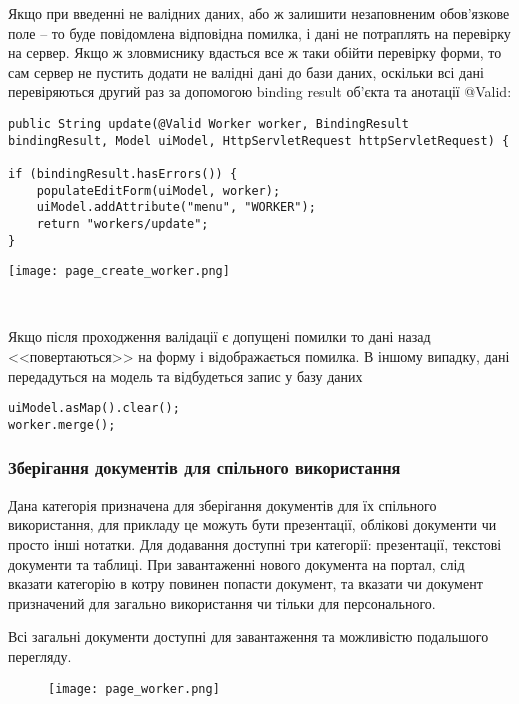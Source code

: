\par Якщо при введенні не валідних даних, або ж залишити незаповненим обов'язкове поле -- то буде повідомлена відповідна помилка, і дані не потраплять на перевірку на сервер. Якщо ж зловмиснику вдасться все ж таки обійти перевірку форми, то сам сервер не пустить додати не валідні дані до бази даних, оскільки всі дані перевіряються другий раз за допомогою binding result об'єкта та анотації @Valid:
\begin{lstlisting}
public String update(@Valid Worker worker, BindingResult bindingResult, Model uiModel, HttpServletRequest httpServletRequest) {

if (bindingResult.hasErrors()) {
    populateEditForm(uiModel, worker);
    uiModel.addAttribute("menu", "WORKER");
    return "workers/update";
}
\end{lstlisting}

\begin{center}
      \texttt{[image: page\_create\_worker.png]}
      \par \
      \label{pic:page_create_worker}
  \end{center}

\par Якщо після проходження валідації є допущені помилки то дані назад <<повертаються>> на форму і відображається помилка. В іншому випадку, дані передадуться на модель та відбудеться запис у базу даних
\begin{lstlisting}
uiModel.asMap().clear();
worker.merge();
\end{lstlisting}


\subsubsection{Зберігання документів для спільного використання}
Дана категорія призначена для зберігання документів для їх спільного використання, для прикладу це можуть бути презентації, облікові документи чи просто інші нотатки. Для додавання доступні три категорії: презентації, текстові документи та таблиці. При завантаженні нового документа на портал, слід вказати категорію в котру повинен попасти документ, та вказати чи документ призначений для загально використання чи тільки для персонального.
\par Всі загальні документи доступні для завантаження та можливістю подальшого перегляду.

\begin{figure}[!ht]
  \centering
      \texttt{[image: page\_worker.png]}
      \par \
      \label{pic:page_worker}
  \end{figure}

